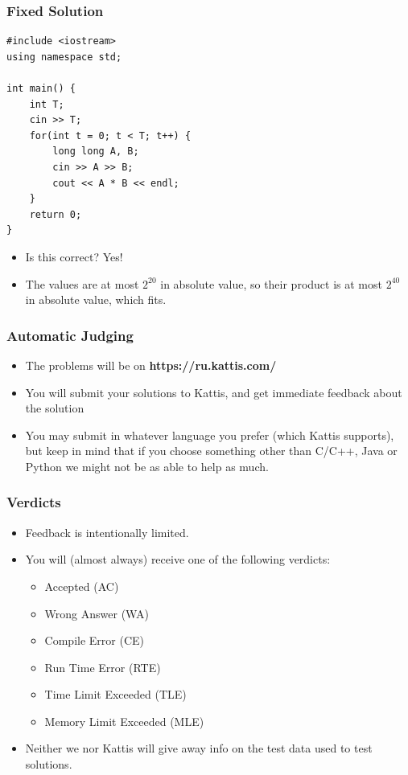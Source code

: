 \documentclass{beamer}
\begin{document}
\begin{frame}
    \frametitle{Fixed Solution}
	\begin{scriptsize}
        \begin{verbatim}
#include <iostream>
using namespace std;

int main() {
    int T;
    cin >> T;
    for(int t = 0; t < T; t++) {
        long long A, B;
        cin >> A >> B;
        cout << A * B << endl;
    }
    return 0;
}
        \end{verbatim}
    \end{scriptsize}
    \begin{itemize}
        \item<2-> Is this correct?  {\alert{Yes!}}
        \item<3-> The values are at most $2^{20}$ in absolute value, so their product is at most $2^{40}$ in absolute value, which fits. 
    \end{itemize}
\end{frame}

\begin{frame}[plain]
    \frametitle{Automatic Judging}
    \begin{itemize}
        \item The problems will be on \textbf{https://ru.kattis.com/}
        \item You will submit your solutions to Kattis, and get immediate feedback about the solution
        \item You may submit in whatever language you prefer (which Kattis supports), but keep in mind that if you choose something other than C/C++, Java or Python we might not be as able to help as much.
    \end{itemize}
\end{frame}

\begin{frame}[plain]
    \frametitle{Verdicts}
    \begin{itemize}
        \item Feedback is intentionally limited.
        \item You will (almost always) receive one of the following verdicts:
        \begin{itemize}
            \item Accepted (AC)
            \item Wrong Answer (WA)
            \item Compile Error (CE)
            \item Run Time Error (RTE)
            \item Time Limit Exceeded (TLE)
            \item Memory Limit Exceeded (MLE)
        \end{itemize}
        \item Neither we nor Kattis will give away info on the test data used to test solutions.
    \end{itemize}
\end{frame}
\end{document}
